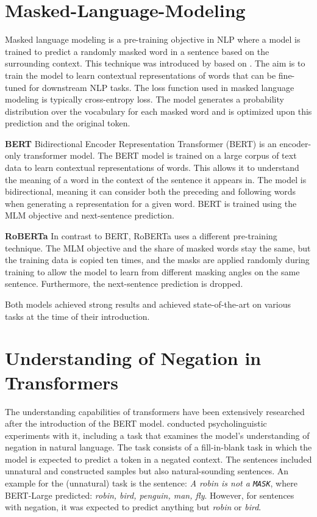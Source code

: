 \documentclass{article}
\begin{document}
\section{Masked-Language-Modeling}
\label{section::MLM}
Masked language modeling is a pre-training objective in NLP where a model is trained to predict a randomly masked word in a sentence based on the surrounding context. This technique was introduced by \cite{devlin-etal-2019-bert} based on \cite{taylor-cloze}. The aim is to train the model to learn contextual representations of words that can be fine-tuned for downstream NLP tasks.
The loss function used in masked language modeling is typically cross-entropy loss. The model generates a probability distribution over the vocabulary for each masked word and is optimized upon this prediction and the original token. 

\textbf{BERT} Bidirectional Encoder Representation Transformer (BERT) \citep{devlin-etal-2019-bert} is an encoder-only transformer model. The BERT model is trained on a large corpus of text data to learn contextual representations of words. This allows it to understand the meaning of a word in the context of the sentence it appears in. The model is bidirectional, meaning it can consider both the preceding and following words when generating a representation for a given word. BERT is trained using the MLM objective and next-sentence prediction. %

\textbf{RoBERTa} In contrast to BERT, RoBERTa \citep{liu2019roberta} uses a different pre-training technique. The MLM objective and the share of masked words stay the same, but the training data is copied ten times, and the masks are applied randomly during training to allow the model to learn from different masking angles on the same sentence. Furthermore, the next-sentence prediction is dropped.

Both models achieved strong results and achieved state-of-the-art on various tasks at the time of their introduction.

\section{Understanding of Negation in Transformers}
\label{section::understanding}
The understanding capabilities of transformers have been extensively researched after the introduction of the BERT model. 
\cite{ettinger-2020-bert} conducted psycholinguistic experiments with it, including a task that examines the model's understanding of negation in natural language.
The task consists of a fill-in-blank task in which the model is expected to predict a token in a negated context. The sentences included unnatural and constructed samples but also natural-sounding sentences. An example for the (unnatural) task is the sentence: \textit{A robin is not a \texttt{MASK}}, where BERT-Large predicted: \textit{robin, bird, penguin, man, fly}. However, for sentences with negation, it was expected to predict anything but \textit{robin} or \textit{bird}.
\end{document}
